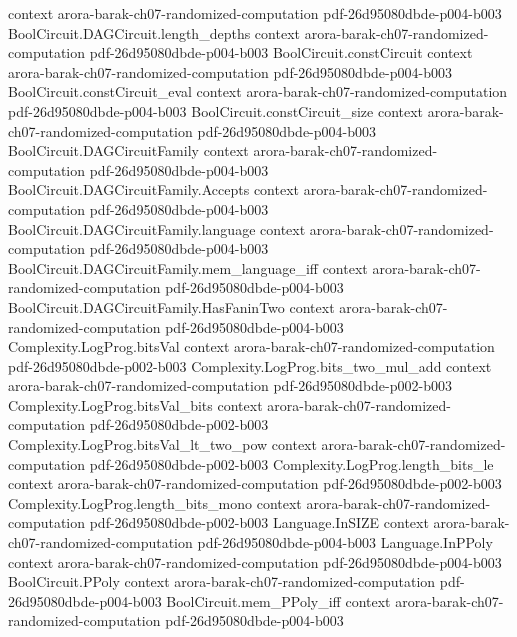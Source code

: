 \begin{theorem}
  {context}
  {arora-barak-ch07-randomized-computation}
  {pdf-26d95080dbde-p004-b003}
\proofstep
  {BoolCircuit.DAGCircuit.length_depths}
  {context}
  {arora-barak-ch07-randomized-computation}
  {pdf-26d95080dbde-p004-b003}
\proofstep
  {BoolCircuit.constCircuit}
  {context}
  {arora-barak-ch07-randomized-computation}
  {pdf-26d95080dbde-p004-b003}
\proofstep
  {BoolCircuit.constCircuit_eval}
  {context}
  {arora-barak-ch07-randomized-computation}
  {pdf-26d95080dbde-p004-b003}
\proofstep
  {BoolCircuit.constCircuit_size}
  {context}
  {arora-barak-ch07-randomized-computation}
  {pdf-26d95080dbde-p004-b003}
\proofstep
  {BoolCircuit.DAGCircuitFamily}
  {context}
  {arora-barak-ch07-randomized-computation}
  {pdf-26d95080dbde-p004-b003}
\proofstep
  {BoolCircuit.DAGCircuitFamily.Accepts}
  {context}
  {arora-barak-ch07-randomized-computation}
  {pdf-26d95080dbde-p004-b003}
\proofstep
  {BoolCircuit.DAGCircuitFamily.language}
  {context}
  {arora-barak-ch07-randomized-computation}
  {pdf-26d95080dbde-p004-b003}
\proofstep
  {BoolCircuit.DAGCircuitFamily.mem_language_iff}
  {context}
  {arora-barak-ch07-randomized-computation}
  {pdf-26d95080dbde-p004-b003}
\proofstep
  {BoolCircuit.DAGCircuitFamily.HasFaninTwo}
  {context}
  {arora-barak-ch07-randomized-computation}
  {pdf-26d95080dbde-p004-b003}
\proofstep
  {Complexity.LogProg.bitsVal}
  {context}
  {arora-barak-ch07-randomized-computation}
  {pdf-26d95080dbde-p002-b003}
\proofstep
  {Complexity.LogProg.bits_two_mul_add}
  {context}
  {arora-barak-ch07-randomized-computation}
  {pdf-26d95080dbde-p002-b003}
\proofstep
  {Complexity.LogProg.bitsVal_bits}
  {context}
  {arora-barak-ch07-randomized-computation}
  {pdf-26d95080dbde-p002-b003}
\proofstep
  {Complexity.LogProg.bitsVal_lt_two_pow}
  {context}
  {arora-barak-ch07-randomized-computation}
  {pdf-26d95080dbde-p002-b003}
\proofstep
  {Complexity.LogProg.length_bits_le}
  {context}
  {arora-barak-ch07-randomized-computation}
  {pdf-26d95080dbde-p002-b003}
\proofstep
  {Complexity.LogProg.length_bits_mono}
  {context}
  {arora-barak-ch07-randomized-computation}
  {pdf-26d95080dbde-p002-b003}
\proofstep
  {Language.InSIZE}
  {context}
  {arora-barak-ch07-randomized-computation}
  {pdf-26d95080dbde-p004-b003}
\proofstep
  {Language.InPPoly}
  {context}
  {arora-barak-ch07-randomized-computation}
  {pdf-26d95080dbde-p004-b003}
\proofstep
  {BoolCircuit.PPoly}
  {context}
  {arora-barak-ch07-randomized-computation}
  {pdf-26d95080dbde-p004-b003}
\proofstep
  {BoolCircuit.mem_PPoly_iff}
  {context}
  {arora-barak-ch07-randomized-computation}
  {pdf-26d95080dbde-p004-b003}

\end{theorem}
